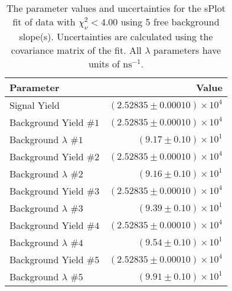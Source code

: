 
\begin{table}
    \begin{center}
        \begin{tabular}{lr}\toprule
            Parameter & Value \\\midrule
            Signal Yield & $(2.52835 \pm 0.00010) \times 10^{4}$ \\
            Background Yield $\#1$ & $(2.52835 \pm 0.00010) \times 10^{4}$ \\
            Background $\lambda$ $\#1$ & $(9.17 \pm 0.10) \times 10^{1}$ \\
            Background Yield $\#2$ & $(2.52835 \pm 0.00010) \times 10^{4}$ \\
            Background $\lambda$ $\#2$ & $(9.16 \pm 0.10) \times 10^{1}$ \\
            Background Yield $\#3$ & $(2.52835 \pm 0.00010) \times 10^{4}$ \\
            Background $\lambda$ $\#3$ & $(9.39 \pm 0.10) \times 10^{1}$ \\
            Background Yield $\#4$ & $(2.52835 \pm 0.00010) \times 10^{4}$ \\
            Background $\lambda$ $\#4$ & $(9.54 \pm 0.10) \times 10^{1}$ \\
            Background Yield $\#5$ & $(2.52835 \pm 0.00010) \times 10^{4}$ \\
            Background $\lambda$ $\#5$ & $(9.91 \pm 0.10) \times 10^{1}$ \\\bottomrule
        \end{tabular}
        \caption{The parameter values and uncertainties for the sPlot fit of data with $\chi^2_\nu < 4.00$ using 5 free background slope(s). Uncertainties are calculated using the covariance matrix of the fit. All $\lambda$ parameters have units of $\si{\nano\second}^{-1}$.}
    \end{center}
\end{table}
